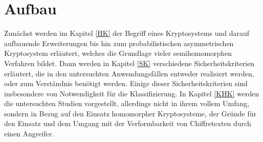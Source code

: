 \section{Aufbau}

Zunächst werden im Kapitel \ref{HK} der Begriff eines Kryptosystems und darauf aufbauende Erweiterungen bis hin zum probabilistischen asymmetrischen Kryptosystem erläutert, welches die Grundlage vieler semihomomorphen Verfahren bildet. Dann werden in Kapitel \ref{SK} verschiedene Sicherheitskriterien erläutert, die in den untersuchten Anwendungsfällen entweder realisiert werden, oder zum Verständnis benötigt werden. Einige dieser Sicherheitskriterien sind insbesondere von Notwendigkeit für die Klassifizierung. In Kapitel \ref{KHK} werden die untersuchten Studien vorgestellt, allerdings nicht in ihrem vollem Umfang, sondern in Bezug auf den Einsatz homomorpher Kryptosysteme, der Gründe für den Einsatz und dem Umgang mit der Verformbarkeit von Chiffretexten durch einen Angreifer.


